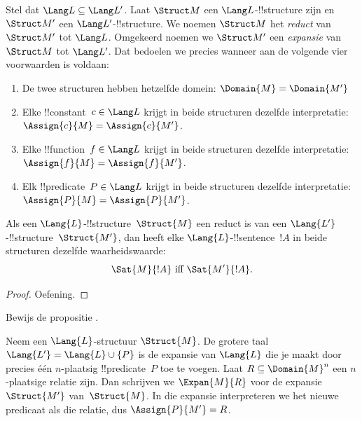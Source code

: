 \documentclass[openany]{memoir}
\begin{document}
\begin{defn}
Stel dat $\Lang L \subseteq \Lang L'$. Laat $\Struct M$ een
$\Lang L$-!!{structure} zijn en $\Struct M'$ een
$\Lang L'$-!!{structure}. We noemen $\Struct M$ het
\emph{reduct} van $\Struct M'$ tot $\Lang L$. Omgekeerd noemen we
$\Struct M'$ een \emph{expansie} van $\Struct M$ tot $\Lang L'$.
Dat bedoelen we precies wanneer aan de volgende vier voorwaarden is
voldaan:
\begin{enumerate}
\item De twee structuren hebben hetzelfde domein:
  $\Domain{M} = \Domain{M'}$
\item Elke !!{constant}~$c \in \Lang L$ krijgt in beide structuren
  dezelfde interpretatie: $\Assign{c}{M} =
  \Assign{c}{M'}$.
\item Elke !!{function}~$f \in \Lang L$ krijgt in beide structuren
  dezelfde interpretatie: $\Assign{f}{M} =
  \Assign{f}{M'}$.
\item Elk !!{predicate}~$P \in \Lang L$ krijgt in beide structuren
  dezelfde interpretatie: $\Assign{P}{M} =
  \Assign{P}{M'}$.
\end{enumerate}
\end{defn}

\begin{prop}
Als een $\Lang{L}$-!!{structure}~$\Struct{M}$ een reduct is van een
$\Lang{L'}$-!!{structure}~$\Struct{M'}$, dan heeft elke
$\Lang{L}$-!!{sentence}~$!A$ in beide structuren dezelfde
waarheidswaarde:
\[
\Sat{M}{!A} \text{ iff } \Sat{M'}{!A}.
\]
\end{prop}

\begin{proof}
  Oefening.
\end{proof}

\begin{prob}
Bewijs de propositie .
\end{prob}

\begin{defn}
Neem een $\Lang{L}$-structuur $\Struct{M}$. De grotere taal
$\Lang{L'} = \Lang{L} \cup \{P\}$ is de expansie van $\Lang{L}$ die
je maakt door precies één $n$-plaatsig !!{predicate}~$P$ toe te voegen.
Laat
$R \subseteq \Domain{M}^n$ een $n$-plaatsige relatie zijn. Dan
schrijven we $\Expan{M}{R}$ voor de expansie~$\Struct{M'}$
van~$\Struct{M}$. In die expansie interpreteren we het nieuwe predicaat
als die relatie, dus $\Assign{P}{M'} = R$.
\end{defn}
\endgroup
\end{document}
